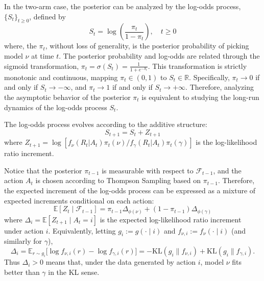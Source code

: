 \documentclass[12pt]{article}
\begin{document}
In the two-arm case, the posterior can be analyzed by the log-odds process, $\{S_t\}_{t \geq 0}$, defined by
\begin{equation}
S_t = \log\left(\frac{\pi_t}{1-\pi_t}\right), \quad t \geq 0
\end{equation}
where, the $\pi_t$, without loss of generality, is the posterior probability of picking model $\nu$ at time $t$. The posterior probability and log-odds are related through the sigmoid transformation, $\pi_t = \sigma(S_t) = \frac{1}{1 + e^{-S_t}}$. This transformation is strictly monotonic and continuous, mapping $\pi_t \in (0,1)$ to $S_t \in \mathbb{R}$. Specifically, $\pi_t \to 0$ if and only if $S_t \to -\infty$, and $\pi_t \to 1$ if and only if $S_t \to +\infty$. Therefore, analyzing the asymptotic behavior of the posterior $\pi_t$ is equivalent to studying the long-run dynamics of the log-odds process $S_t$.

The log-odds process evolves according to the additive structure:
\begin{equation}
S_{t+1} = S_t + Z_{t+1}
\label{eq:log-odds-two-arm}
\end{equation}
where $Z_{t+1} = \log[f_{\nu}(R_t|A_t) \pi_t(\nu)/f_{\gamma}(R_t|A_t) \pi_t(\gamma)]$ is the log-likelihood ratio increment. 

Notice that the posterior $\pi_{t-1}$ is measurable with respect to $\mathcal{F}_{t-1}$, and the action $A_t$ is chosen according to Thompson Sampling based on $\pi_{t-1}$. Therefore, the expected increment of the log-odds process can be expressed as a mixture of expected increments conditional on each action:
\begin{equation}
    \label{eq:two-arm-logodds-increment}
        \mathbb{E}[Z_t \mid \mathcal{F}_{t-1}] = \pi_{t-1} \Delta_{\phi(\nu)} + (1-\pi_{t-1}) \Delta_{\phi(\gamma)}
\end{equation}
where $\Delta_i = \mathbb{E}[Z_{t+1} \mid A_t = i]$ is the expected log-likelihood ratio increment under action $i$. Equivalently, letting $g_i := g(\cdot\mid i)$ and $f_{\nu,i}:=f_{\nu}(\cdot\mid i)$ (and similarly for $\gamma$),
\begin{equation}
\Delta_i = \mathbb{E}_{r\sim g_i}\big[\log f_{\nu,i}(r)-\log f_{\gamma,i}(r)\big] = -\mathrm{KL}(g_i\|f_{\nu,i})+\mathrm{KL}(g_i\|f_{\gamma,i}).
\end{equation}
Thus $\Delta_i>0$ means that, under the data generated by action $i$, model $\nu$ fits better than $\gamma$ in the KL sense.
\end{document}

